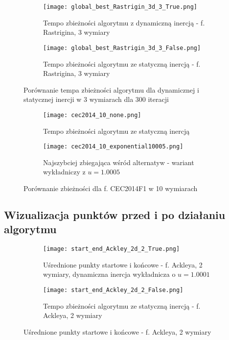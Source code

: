 \documentclass[12pt]{article}
\begin{document}
\begin{figure}[ht]
	\centering
	\begin{subfigure}{0.49\textwidth}
		\texttt{[image: global\_best\_Rastrigin\_3d\_3\_True.png]}
		\caption{Tempo zbieżności algorytmu z dynamiczną inercją - f. Rastrigina, 3 wymiary}
	\end{subfigure}
	\hfill
	\begin{subfigure}{0.49\textwidth}
		\texttt{[image: global\_best\_Rastrigin\_3d\_3\_False.png]}
		\caption{Tempo zbieżności algorytmu ze statyczną inercją - f. Rastrigina, 3 wymiary}
	\end{subfigure}
	\caption{Porównanie tempa zbieżności algorytmu dla dynamicznej i statycznej inercji w 3 wymiarach dla 300 iteracji}
	\label{3d_comp}
\end{figure}

\begin{figure}[ht]
	\centering
	\begin{subfigure}{0.49\textwidth}
		\texttt{[image: cec2014\_10\_none.png]}
		\caption{Tempo zbieżności algorytmu ze statyczną inercją}
	\end{subfigure}
	\hfill
	\begin{subfigure}{0.49\textwidth}
		\texttt{[image: cec2014\_10\_exponential10005.png]}
		\caption{Najszybciej zbiegająca wśród alternatyw - wariant wykładniczy z $u = 1.0005$}
	\end{subfigure}
	\caption{Porównanie zbieżności dla f. CEC2014F1 w 10 wymiarach}
	\label{cec2014_comp}
\end{figure}

\pagebreak
\FloatBarrier


\subsection*{Wizualizacja punktów przed i po działaniu algorytmu}

\begin{figure}[h!]
	\centering
	\begin{subfigure}{0.49\textwidth}
		\texttt{[image: start\_end\_Ackley\_2d\_2\_True.png]}
		\caption{Uśrednione punkty startowe i końcowe - f. Ackleya, 2 wymiary, dynamiczna inercja wykładnicza o $u = 1.0001$}
	\end{subfigure}
	\hfill
	\begin{subfigure}{0.49\textwidth}
		\texttt{[image: start\_end\_Ackley\_2d\_2\_False.png]}
		\caption{Tempo zbieżności algorytmu ze statyczną inercją - f. Ackleya, 2 wymiary}
	\end{subfigure}
	\caption{Uśrednione punkty startowe i końcowe - f. Ackleya, 2 wymiary}
	\label{ackley_start_end}
\end{figure}
\end{document}
